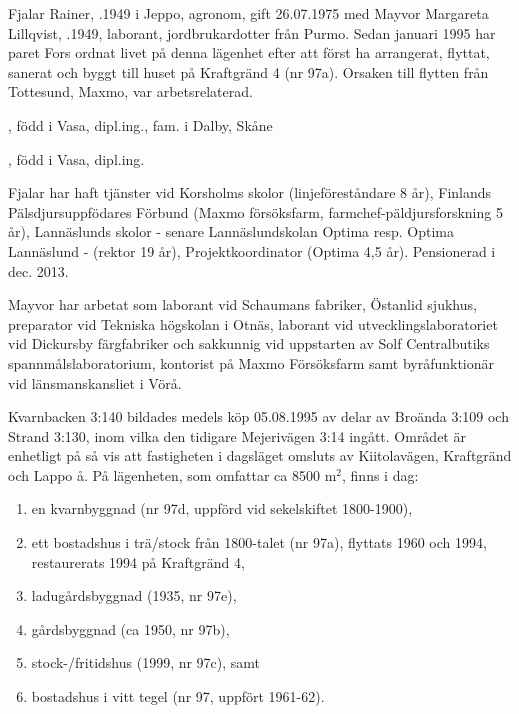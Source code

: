


Fjalar Rainer, .1949 i Jeppo, agronom, gift 26.07.1975 med Mayvor Margareta Lillqvist, .1949, laborant, jordbrukardotter från Purmo. Sedan januari 1995 har paret Fors ordnat livet på denna lägenhet efter att först ha arrangerat, flyttat, sanerat och	byggt till huset på Kraftgränd 4 (nr 97a). Orsaken till flytten från Tottesund, Maxmo, var arbetsrelaterad.
\begin{jhchildren}
  \item {}, född i Vasa, dipl.ing., fam. i Dalby, Skåne
  \item {}, född i Vasa, dipl.ing.
\end{jhchildren}

Fjalar har haft tjänster vid Korsholms skolor (linjeföreståndare 8 år), Finlands Pälsdjursuppfödares Förbund (Maxmo försöksfarm, farmchef-päldjursforskning 5 år), Lannäslunds skolor - senare Lannäslundskolan Optima resp. Optima Lannäslund - (rektor 19 år), Projektkoordinator (Optima 4,5 år).	Pensionerad i dec. 2013.

Mayvor har arbetat som laborant vid Schaumans fabriker, Östanlid sjukhus, preparator vid Tekniska högskolan i Otnäs, laborant vid utvecklingslaboratoriet vid Dickursby färgfabriker och sakkunnig vid uppstarten av Solf Centralbutiks spannmålslaboratorium, kontorist på Maxmo Försöksfarm samt byråfunktionär vid länsmanskansliet i Vörå.

Kvarnbacken 3:140 bildades medels köp 05.08.1995 av delar av Broända 3:109 och Strand 3:130, inom vilka den tidigare Mejerivägen 3:14 ingått. Området är enhetligt på så vis att fastigheten i dagsläget omsluts av Kiitolavägen, Kraftgränd och Lappo å. På lägenheten, som omfattar ca 8500 m$^2$, finns i dag:
\begin{enumerate}
  \item en kvarnbyggnad (nr 97d, uppförd vid sekelskiftet 1800-1900),
  \item ett bostadshus i trä/stock från 1800-talet (nr 97a), flyttats 1960 och 1994, restaurerats 1994 på Kraftgränd 4,
  \item ladugårdsbyggnad (1935, nr 97e),
  \item gårdsbyggnad (ca 1950, nr 97b),
  \item stock-/fritidshus (1999, nr 97c), samt
  \item bostadshus i vitt tegel (nr 97, uppfört 1961-62).
\end{enumerate}

